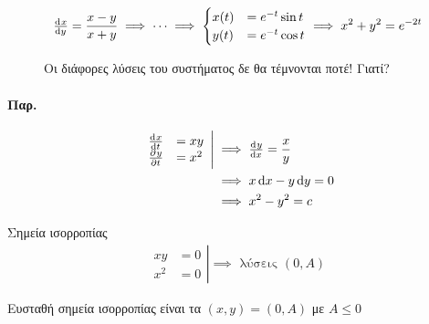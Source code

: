 \documentclass[11pt,a4paper,titlepage,final]{article}
\begin{document}
\begin{align*}
\od{x}{y} = \frac{x-y}{x+y} \implies \cdots \implies \begin{cases}
x(t) &=e^{-t}\sin t \\
y(t) &= e^{-t} \cos t
\end{cases} \implies x^2+y^2=e^{-2t}
\end{align*}

\begin{figure}[h]
Οι διάφορες λύσεις του συστήματος δε θα τέμνονται ποτέ! Γιατί?
\end{figure}


\paragraph{Παρ.}
\begin{align*}
\left. \begin{array}{ll}
\od{x}{t} &= xy \\
\pd{y}{t} &= x^2
\end{array} \right| &\implies \od{y}{x} = \frac{x}{y}
\\ &\implies x\dif x-y\dif y = 0
\\ &\implies x^2-y^2 =c
\end{align*}

Σημεία ισορροπίας
\begin{align*}
\left.
\begin{array}{ll}
xy &=0 \\ x^2 & = 0
\end{array} \right| \implies \text{ λύσεις } (0,A)
\end{align*}

Ευσταθή σημεία ισορροπίας είναι τα \( (x,y)=(0,A) \) με \( A \leq 0 \)
\end{document}

